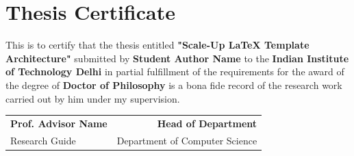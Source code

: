 \chapter*{Thesis Certificate}
This is to certify that the thesis entitled \textbf{"Scale-Up LaTeX Template Architecture"} submitted by \textbf{Student Author Name} to the \textbf{Indian Institute of Technology Delhi} in partial fulfillment of the requirements for the award of the degree of \textbf{Doctor of Philosophy} is a bona fide record of the research work carried out by him under my supervision.

\vspace{2cm}
\noindent
\begin{tabular*}{\textwidth}{@{\extracolsep{\fill}}lr}
    \textbf{Prof. Advisor Name} & \textbf{Head of Department} \\
    Research Guide & Department of Computer Science
\end{tabular*}

